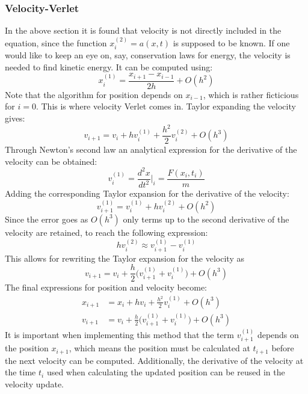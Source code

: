 \subsubsection{Velocity-Verlet}
In the above section it is found that velocity is not directly included in the equation, since
the function $x_i^{{(2)}} = a(x,t)$ is supposed to be known. If one would like to keep an eye on, say,
conservation laws for energy, the velocity is needed to find kinetic energy. It can be computed
using:
\begin{equation*}
x_i^{(1)} = \frac{x_{i+1} - x_{i-1}}{2h} + O(h^2)
\end{equation*}
Note that the algorithm for position depends on $x_{i-1}$, which is rather ficticious for $i=0$.
This is where velocity Verlet comes in.  
\newline 
Taylor expanding the velocity gives:
\begin{equation*}
v_{i+1} = v_i + hv_i^{(1)} + \frac{h^2}{2}v_i^{{(2)}} + O(h^3)
\end{equation*}
Through Newton's second law an analytical expression for the derivative of the velocity can be
obtained:
\begin{equation*}
v_i^{(1)} = \frac{d^2x}{dt^2}|_i =\frac{F(x_i,t_i)}{m}
\end{equation*}
Adding the corresponding Taylor expansion for the derivative of the velocity:
\begin{equation*}
v_{i+1}^{(1)} = v_i^{(1)} + hv_i^{{(2)}} + O(h^2)
\end{equation*}
Since the error goes as $O(h^3)$ only terms up to the second derivative of the velocity are retained,
to reach the following expression:
\begin{equation*}
hv_i^{{(2)}} \approx v_{i+1}^{(1)} - v_i^{(1)}
\end{equation*}
This allows for rewriting the Taylor expansion for the velocity as
\begin{equation*}
v_{i+1} = v_i + \frac{h}{2}\big(v_{i+1}^{(1)} + v_i^{(1)}\big) + O(h^3)
\end{equation*}
The final expressions for position and velocity become:
\begin{align*}
x_{i+1} &= x_i + hv_i + \frac{h^2}{2}v_i^{(1)} + O(h^3) \\
v_{i+1} &= v_i + \frac{h}{2}\big(v_{i+1}^{(1)} + v_i^{(1)}\big) + O(h^3)
\end{align*}
It is important when implementing this method that the term $v_{i+1}^{(1)}$ depends on the position
$x_{i+1}$, which means the position must be calculated at $t_{i+1}$ before the next velocity can
be computed. Additionally, the derivative of the velocity at the time $t_i$ used when calculating
the updated position can be reused in the velocity update.

